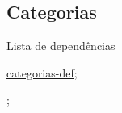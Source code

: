 \subsection{Categorias}
\label{categorias-ex}
\begin{titlemize}{Lista de dependências}
	\item \hyperref[categorias-def]{categorias-def};\\ %
	\item \hyperref[]{};\\
\end{titlemize}

